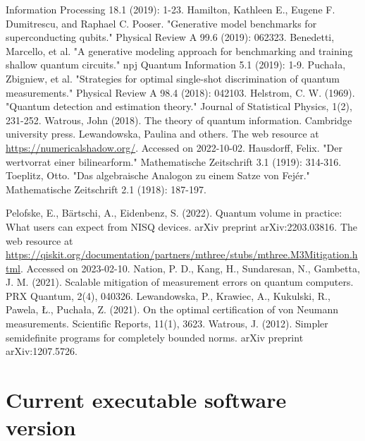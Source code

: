 \documentclass[preprint,12pt, a4paper, dvipsnames]{elsarticle}
\newcommand{\1}{{\rm 1\hspace{-0.9mm}l}}
\begin{document}
\begin{thebibliography}{00}
Information Processing 18.1 (2019): 1-23.
 Hamilton, Kathleen E., Eugene F. Dumitrescu,
and Raphael C. Pooser. "Generative model benchmarks for superconducting
qubits." Physical Review A 99.6 (2019): 062323.
 Benedetti, Marcello, et al. "A generative
modeling approach for benchmarking and training shallow quantum circuits." npj
Quantum Information 5.1 (2019): 1-9.
 Puchała, Zbigniew, et al. "Strategies for
optimal single-shot discrimination of quantum measurements." Physical Review A
98.4 (2018): 042103.
 Helstrom, C. W. (1969). "Quantum detection and estimation theory." Journal of Statistical Physics, 1(2), 231-252.
 Watrous, John (2018). The theory of quantum information. Cambridge university press.
 Lewandowska, Paulina and others. The web resource at \url{https://numericalshadow.org/}. Accessed on 2022-10-02.
 Hausdorff, Felix. "Der wertvorrat einer bilinearform." Mathematische Zeitschrift 3.1 (1919): 314-316.
 Toeplitz, Otto. "Das algebraische Analogon zu einem Satze von Fejér." Mathematische Zeitschrift 2.1 (1918): 187-197.

 Pelofske, E., B{\"a}rtschi, A., Eidenbenz, S. (2022). Quantum volume in practice: What users can expect from NISQ devices. arXiv preprint arXiv:2203.03816.
 The web resource at \url{https://qiskit.org/documentation/partners/mthree/stubs/mthree.M3Mitigation.html}. Accessed on 2023-02-10.
 Nation, P. D., Kang, H., Sundaresan, N.,  Gambetta, J. M. (2021). Scalable mitigation of measurement errors on quantum computers. PRX Quantum, 2(4), 040326.
 Lewandowska, P., Krawiec, A., Kukulski, R., Pawela, Ł.,  Puchała, Z. (2021). On the optimal certification of von Neumann measurements. Scientific Reports, 11(1), 3623.
 Watrous, J. (2012). Simpler semidefinite programs for completely bounded norms. arXiv preprint arXiv:1207.5726.
\end{thebibliography}



\section*{Current executable software version}
\label{}
\end{document}
